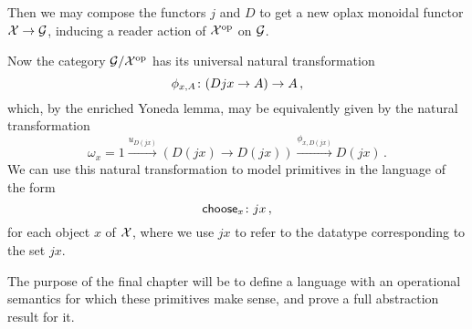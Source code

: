 \documentclass{article}
\begin{document}
Then we may compose the functors $j$ and $D$ to get a new oplax monoidal functor $\mathcal X \to \mathcal G$, inducing a reader action of $\mathcal X^{\mathrm{op}}$ on $\mathcal G$.

Now the category $\mathcal G/\mathcal X^{\mathrm{op}}$ has its universal natural transformation
\[
  \phi_{x,A} \colon (Djx \to A) \to A\,,
  \]
which, by the enriched Yoneda lemma, may be equivalently given by the natural transformation
\[
  \omega_x = 1 \xrightarrow{u_{D(jx)}} (D(jx) \to D(jx)) \xrightarrow{\phi_{x,D(jx)}} D(jx)\,.
  \]
We can use this natural transformation to model primitives in the language of the form
\[
  \operatorname{\mathsf{choose}}_x \colon jx\,,
  \]
for each object $x$ of $\mathcal X$, where we use $jx$ to refer to the datatype corresponding to the set $jx$.

The purpose of the final chapter will be to define a language with an operational semantics for which these primitives make sense, and prove a full abstraction result for it.



\end{document}

